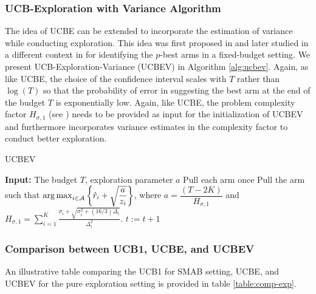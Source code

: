 \subsubsection{UCB-Exploration with Variance Algorithm}

The idea of UCBE can be extended to incorporate the estimation of variance while conducting exploration. This idea was first proposed in \citet{audibert2010best} and later studied in a different context in \citet{gabillon2011multi} for identifying the $p$-best arms in a fixed-budget setting. We present UCB-Exploration-Variance (UCBEV) in Algorithm  \ref{alg:ucbev}. Again, as like UCBE, the choice of the confidence interval scales with $T$ rather than $\log (T)$ so that the probability of error in suggesting the best arm at the end of the budget $T$ is exponentially low. Again, like UCBE, the problem complexity factor $H_{\sigma,1}$ (see \citet{gabillon2011multi}) needs to be provided as input for the initialization of UCBEV and furthermore incorporates variance estimates in the complexity factor to conduct better exploration.


\begin{algorithm}[!ht]
\caption{UCBEV}
\label{alg:ucbev}
\begin{algorithmic}[1]
\State \textbf{Input: } The budget $T$, exploration parameter $a$
\State Pull each arm once
\State Pull the arm such that $\operatorname*{arg\,max}_{i\in \mathcal{A}}\bigg\lbrace\hat{r}_{i} + \sqrt{\dfrac{a}{z_i}}\bigg\rbrace$, where $a = \dfrac{(T-2K)}{H_{\sigma,1}}$ and $H_{\sigma,1}=\sum_{i=1}^{K}\frac{\sigma_{i}+\sqrt{\sigma_{i}^{2}+(16/3)\Delta_{i}}}{\Delta_{i}^{2}}$.
\State $t:=t+1 $
\EndFor
\end{algorithmic}
\end{algorithm}

\subsubsection{Comparison between UCB1, UCBE, and UCBEV}

An illustrative table comparing the UCB1 for SMAB setting, UCBE, and UCBEV for the pure exploration setting is provided in table \ref{table:comp-exp}.

